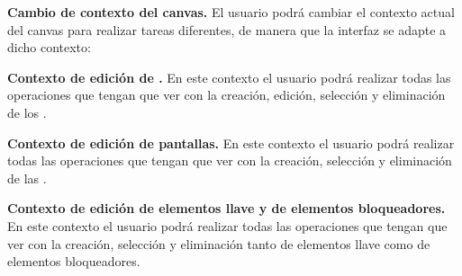 	\item \textbf{Cambio de contexto del canvas.}\newline
		El usuario podrá cambiar el contexto actual del canvas para realizar tareas diferentes, de manera que la interfaz se adapte a dicho contexto:
		\begin{functional}
			\item \textbf{Contexto de edición de .}\newline
				En este contexto el usuario podrá realizar todas las operaciones que tengan que ver con la creación, edición, selección y eliminación de los .
			\item \textbf{Contexto de edición de pantallas.}\newline
				En este contexto el usuario podrá realizar todas las operaciones que tengan que ver con la creación, selección y eliminación de las .
			\item \textbf{Contexto de edición de elementos llave y de elementos bloqueadores.}\newline
				En este contexto el usuario podrá realizar todas las operaciones que tengan que ver con la creación, selección y eliminación tanto de elementos llave como de elementos bloqueadores.
		\end{functional}
